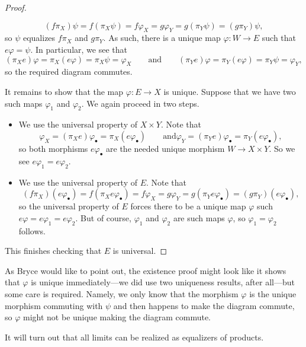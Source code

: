 \begin{proof}
\begin{itemize}
		\[(f\pi_X)\psi=f(\pi_X\psi)=f\varphi_X=g\varphi_Y=g(\pi_Y\psi)=(g\pi_Y)\psi,\]
		so $\psi$ equalizes $f\pi_X$ and $g\pi_Y$. As such, there is a unique map $\varphi:W\to E$ such that $e\varphi=\psi$. In particular, we see that
		\[(\pi_Xe)\varphi=\pi_X(e\varphi)=\pi_X\psi=\varphi_X\qquad\text{and}\qquad(\pi_Ye)\varphi=\pi_Y(e\varphi)=\pi_Y\psi=\varphi_Y,\]
		so the required diagram commutes.
	\end{itemize}
	It remains to show that the map $\varphi:E\to X$ is unique. Suppose that we have two such maps $\varphi_1$ and $\varphi_2$. We again proceed in two steps.
	\begin{itemize}
		\item We use the universal property of $X\times Y$. Note that
		\[\varphi_X=(\pi_Xe)\varphi_\bullet=\pi_X(e\varphi_\bullet)\qquad\text{and}\varphi_Y=(\pi_Ye)\varphi_\bullet=\pi_Y(e\varphi_\bullet),\]
		so both morphisms $e\varphi_\bullet$ are the needed unique morphism $W\to X\times Y$. So we see $e\varphi_1=e\varphi_2$.
		\item We use the universal property of $E$. Note that
		\[(f\pi_X)(e\varphi_\bullet)=f(\pi_Xe\varphi_\bullet)=f\varphi_X=g\varphi_Y=g(\pi_Ye\varphi_\bullet)=(g\pi_Y)(e\varphi_\bullet),\]
		so the universal property of $E$ forces there to be a unique map $\varphi$ such $e\varphi=e\varphi_1=e\varphi_2$. But of course, $\varphi_1$ and $\varphi_2$ are such maps $\varphi$, so $\varphi_1=\varphi_2$ follows.
	\end{itemize}
	This finishes checking that $E$ is universal.
\end{proof}
\begin{remark}[Bryce]
	As Bryce would like to point out, the existence proof might look like it shows that $\varphi$ is unique immediately---we did use two uniqueness results, after all---but some care is required. Namely, we only know that the morphism $\varphi$ is the unique morphism commuting with $\psi$ and then happens to make the diagram commute, so $\varphi$ might not be unique making the diagram commute.
\end{remark}
\begin{remark}[Bryce]
	It will turn out that all limits can be realized as equalizers of products.
\end{remark}

